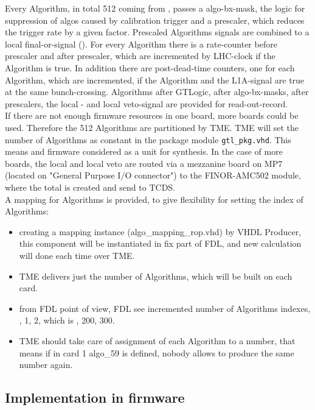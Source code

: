 Every Algorithm, in total 512 coming from \ugtl, passes a algo-bx-mask, the logic for suppression of algos caused by calibration trigger and a prescaler, which reduces the trigger rate by a given factor. Prescaled Algorithms signals are combined to a local final-or-signal (\finor).
For every Algorithm there is a rate-counter before prescaler and after prescaler, which are incremented by LHC-clock if the Algorithm is true. In addition there are post-dead-time counters, one for each Algorithm, which are incremented,
if the Algorithm and the L1A-signal are true at the same bunch-crossing.
Algorithms after GTLogic, after algo-bx-masks, after prescalers, the local \finor- and local veto-signal are provided for read-out-record.\\
If there are not enough firmware resources in one \ugt board, more boards could be used. Therefore the 512 Algorithms are partitioned by TME. TME will set the number of Algorithms as
constant in the package module \texttt{gtl\_pkg.vhd}. This means \ugtl and \ufdl firmware considered as a unit for synthesis. In the case of more \ugt boards, the local \finor and local veto are routed via
a mezzanine board on MP7 (located on "General Purpose I/O connector") to the FINOR-AMC502 module, where the total \finor is created and send to TCDS.\\
A mapping for Algorithms is provided, to give flexibility for setting the index of Algorithms:
\begin {itemize}
\item creating a mapping instance (algo\_mapping\_rop.vhd) by VHDL Producer, this component will be instantiated in fix part of FDL, and new calculation will done each time over TME.
\item TME delivers just the number of Algorithms, which will be built on each card.
\item from FDL point of view, FDL see incremented number of Algorithms indexes, , 1, 2, which is , 200, 300.
\item TME should take care of assignment of each Algorithm to a number, that means if in card 1 algo\_59 is defined, nobody allows to produce the same number again.
\end {itemize}

\clearpage

\subsection{Implementation in firmware}
\label{sec:fdl:implementation_firmware}

